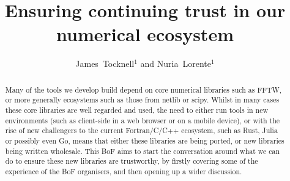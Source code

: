 \documentclass[11pt,twoside]{article}
\begin{document}
\title{Ensuring continuing trust in our numerical ecosystem}

\author{James~Tocknell$^1$ and Nuria~Lorente$^1$}




  
\begin{abstract}

Many of the tools we develop build depend on core numerical libraries such as
FFTW, or more generally ecosystems such as those from netlib or scipy. Whilst in
many cases these core libraries are well regarded and used, the need to either
run tools in new environments (such as client-side in a web browser or on a
mobile device), or with the rise of new challengers to the current Fortran/C/C++
ecosystem, such as Rust, Julia or possibly even Go, means that either these
libraries are being ported, or new libraries being written wholesale. This BoF
aims to start the conversation around what we can do to ensure these new
libraries are trustworthy, by firstly covering some of the experience of the BoF
organisers, and then opening up a wider discussion.

\end{abstract}
\end{document}
